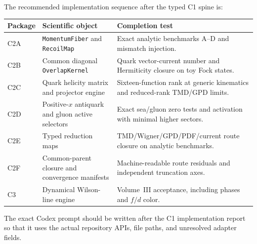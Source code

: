 \documentclass[11pt]{article}
\begin{document}
The recommended implementation sequence after the typed C1 spine is:
\begin{longtable}{L{0.13\textwidth}L{0.31\textwidth}L{0.46\textwidth}}
\toprule
Package & Scientific object & Completion test\\
\midrule
\endhead
C2A & \texttt{MomentumFiber} and \texttt{RecoilMap} & Exact analytic benchmarks A--D and mismatch injection.\\
C2B & Common diagonal \texttt{OverlapKernel} & Quark vector-current number and Hermiticity closure on toy Fock states.\\
C2C & Quark helicity matrix and projector engine & Sixteen-function rank at generic kinematics and reduced-rank TMD/GPD limits.\\
C2D & Positive-\(x\) antiquark and gluon active selectors & Exact sea/gluon zero tests and activation with minimal higher sectors.\\
C2E & Typed reduction maps & TMD/Wigner/GPD/PDF/current route closure on analytic benchmarks.\\
C2F & Common-parent closure and convergence manifests & Machine-readable route residuals and independent truncation axes.\\
C3 & Dynamical Wilson-line engine & Volume~III acceptance, including phases and \(f/d\) color.\\
\bottomrule
\end{longtable}
The exact Codex prompt should be written after the C1 implementation report so
that it uses the actual repository APIs, file paths, and unresolved adapter
fields.
\end{document}
